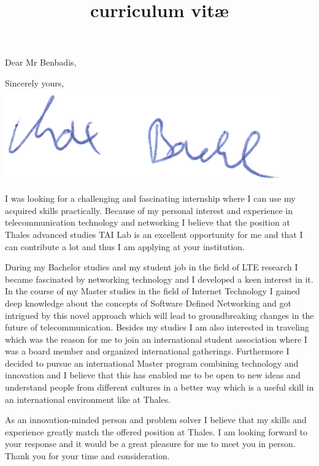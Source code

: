 \documentclass[11pt,a4paper]{moderncv}   %
\title{curriculum vitæ}					%
\begin{document}
\recipient{\employer{}}{}
\opening{Dear Mr Benbadis,}
\closing{Sincerely yours,\\
\vspace*{0.4cm}
\includegraphics{unterschrift.png}
\vspace*{-1.1cm}}
\newcommand{\employer}{Thales advanced studies TAI Lab}
\makelettertitle

I was looking for a challenging and fascinating internship where I can use my acquired skills practically. Because of my personal interest and experience in telecommunication technology and networking I believe that the position at \employer{} is an excellent opportunity for me and that I can contribute a lot and thus I am applying at your institution.

During my Bachelor studies and my student job in the field of LTE research I became fascinated by networking technology and I developed a keen interest in it. In the course of my Master studies in the field of Internet Technology I gained deep knowledge about the concepts of Software Defined Networking and got intrigued by this novel approach which will lead to groundbreaking changes in the future of telecommunication. Besides my studies I am also interested in traveling which was the reason for me to join an international student association where I was a board member and organized international gatherings. Furthermore I decided to pursue an international Master program combining technology and innovation and I believe that this has enabled me to be open to new ideas and understand people from different cultures in a better way which is a useful skill in an international environment like at Thales. 

As an innovation-minded person and problem solver I believe that my skills and experience greatly match the offered position at Thales. I am looking forward to your response and it would be a great pleasure for me to meet you in person. Thank you for your time and consideration.
\end{document}

